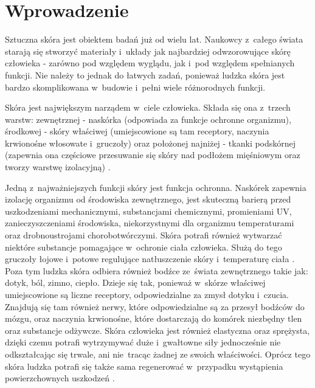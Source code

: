 \newpage %
\section{Wprowadzenie}
\label{s_wprowadzenie}

Sztuczna skóra jest obiektem badań już od wielu lat. Naukowcy z~całego świata starają się stworzyć materiały i~układy jak najbardziej odwzorowujące skórę człowieka - zarówno pod względem wyglądu, jak i~pod względem spełnianych funkcji. Nie należy to jednak do łatwych zadań, ponieważ ludzka skóra jest bardzo skomplikowana w~budowie i~pełni wiele różnorodnych funkcji.

Skóra jest największym narządem w~ciele człowieka. Składa się ona z~trzech warstw: zewnętrznej - naskórka (odpowiada za funkcje ochronne organizmu), środkowej - skóry właściwej (umiejscowione są tam receptory, naczynia krwionośne włosowate i~gruczoły) oraz położonej najniżej - tkanki podskórnej (zapewnia ona częściowe przesuwanie się skóry nad podłożem mięśniowym oraz tworzy warstwę izolacyjną) \cite{b_book_gray}.

Jedną z~najważniejszych funkcji skóry jest funkcja ochronna. Naskórek zapewnia izolację organizmu od środowiska zewnętrznego, jest skuteczną barierą przed uszkodzeniami mechanicznymi, substancjami chemicznymi, promieniami UV, zanieczyszczeniami środowiska, niekorzystnymi dla organizmu temperaturami oraz drobnoustrojami chorobotwórczymi. 
Skóra potrafi również wytwarzać niektóre substancje pomagające w~ochronie ciała człowieka. Służą do tego gruczoły łojowe i~potowe regulujące natłuszczenie skóry i~temperaturę ciała \cite{b_unpublic_skin_1, b_book_skin_2}.
Poza tym ludzka skóra odbiera również bodźce ze~świata zewnętrznego takie jak: dotyk, ból, zimno, ciepło. Dzieje się tak, ponieważ w~skórze właściwej umiejscowione są liczne receptory, odpowiedzialne za zmysł dotyku i~czucia. Znajdują się tam również nerwy, które odpowiedzialne są za przesył bodźców do mózgu, oraz naczynia krwionośne, które dostarczają do komórek niezbędny tlen oraz substancje odżywcze. Skóra człowieka jest również elastyczna oraz sprężysta, dzięki czemu potrafi wytrzymywać duże i~gwałtowne siły jednocześnie nie odkształcając się trwale, ani nie~tracąc żadnej ze swoich właściwości. Oprócz tego skóra ludzka potrafi się także sama regenerować w~przypadku wystąpienia powierzchownych uszkodzeń \cite{b_book_skin_2, b_book_skin_3}.


